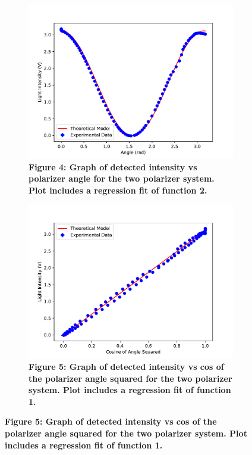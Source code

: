 \documentclass[
	letterpaper, %
	10pt, %
]{CSUniSchoolLabReport}
\begin{document}
\begin{figure}[H]
	\begin{subfigure}{0.45\textwidth}
		\centering
		\includegraphics[width=\textwidth]{../figures/figure4.pdf}
		\caption{\textbf{Figure 4: Graph of detected intensity vs polarizer angle for the two polarizer system. Plot includes a regression fit of function 2. }}
	\end{subfigure}
	\hfill
	\begin{subfigure}{0.45\textwidth}
		\includegraphics[width=\textwidth]{../figures/figure5.pdf}
		\caption{\textbf{Figure 5: Graph of detected intensity vs cos of the polarizer angle squared for the two polarizer system. Plot includes a regression fit of function 1.}}

\end{subfigure}
\end{figure}
\end{document}
